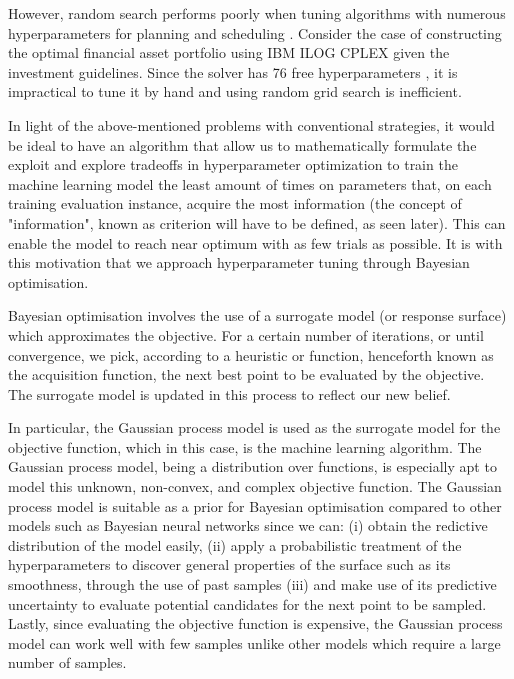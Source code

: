 \documentclass[letterpaper]{article}
\begin{document}
However, random search performs poorly when tuning algorithms with numerous hyperparameters for planning and scheduling \cite{snoek2012practical}. Consider the case of constructing the optimal financial asset portfolio using IBM ILOG CPLEX given the investment guidelines. Since the solver has 76 free hyperparameters \cite{shahriari2016taking}, it is impractical to tune it by hand and using random grid search is inefficient.

In light of the above-mentioned problems with conventional strategies, it would be ideal
to have an algorithm that allow us to mathematically formulate the exploit and explore
tradeoffs in hyperparameter optimization to train the machine learning model the least
amount of times on parameters that, on each training evaluation instance, acquire the
most information (the concept of "information", known as criterion will have to be defined,
as seen later). This can enable the model to reach near optimum with as few trials as possible.
It is with this motivation that we approach hyperparameter tuning through Bayesian optimisation.

Bayesian optimisation involves the use of a surrogate model (or response surface)
\cite{brochu2010tutorial}
which approximates the objective. For a certain number of iterations, or until
convergence, we pick, according to a heuristic or function, henceforth known as the
acquisition function, the next best point to be evaluated by the objective. The
surrogate model is updated in this process to reflect our new belief.

In particular, the Gaussian process model is used as the surrogate model
for the objective function, which in this case, is the machine learning algorithm.
The Gaussian process model, being a distribution over functions, is especially apt
to model this unknown, non-convex, and complex objective function. The Gaussian
process model is suitable as a prior for Bayesian optimisation compared to other
models such as Bayesian neural networks \cite{snoek2015scalable} since we can: (i) obtain the 
redictive distribution of the model easily, (ii) apply a probabilistic treatment of the
hyperparameters to discover general properties of the surface such as its
smoothness, through the use of past samples (iii) and make use of its predictive
uncertainty to evaluate potential candidates for the next point to be sampled.
Lastly, since evaluating the objective function is expensive, the Gaussian process
model can work well with few samples unlike other models which require a large
number of samples.
\end{document}
